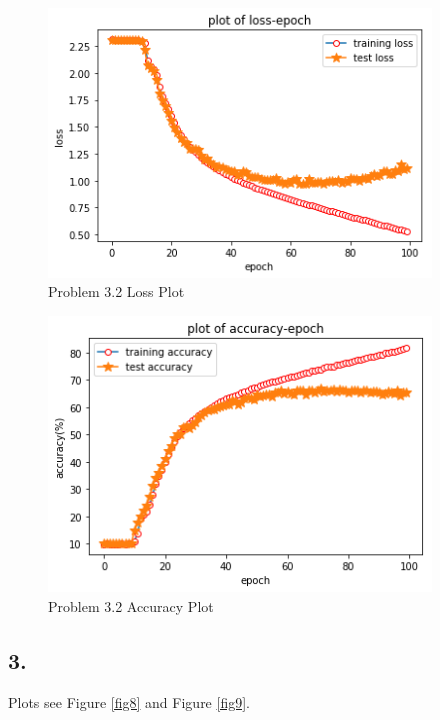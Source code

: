 \documentclass[twoside,12pt]{homework}
\begin{document}
\begin{figure}[!htb]
\begin{center}
\includegraphics[width=4in]{Unknown-3.png}
\caption{Problem 3.2 Loss Plot}
\label{fig6}
\end{center}
\end{figure}

\begin{figure}[!htb]
\begin{center}
\includegraphics[width=4in]{Unknown-4.png}
\caption{Problem 3.2 Accuracy Plot}
\label{fig7}
\end{center}
\end{figure}

\subsection*{3.}

Plots see Figure \ref{fig8} and Figure \ref{fig9}.\\
\end{document}
